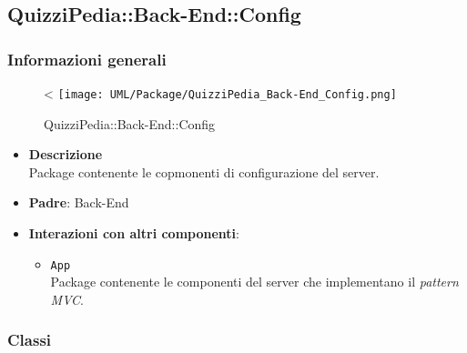 \subsection{QuizziPedia::Back-End::Config}
\subsubsection{Informazioni generali}
\label{QuizziPedia::Back-End::Config}
\begin{figure}
	\centering<
	\texttt{[image: UML/Package/QuizziPedia\_Back-End\_Config.png]}
	\caption{QuizziPedia::Back-End::Config}
\end{figure}
	\begin{itemize}
		\item \textbf{Descrizione} \\
		Package contenente le copmonenti di configurazione del server.
		\item \textbf{Padre}: Back-End
		\item \textbf{Interazioni con altri componenti}:
			\begin{itemize}
				\item \texttt{App} \\
				Package contenente le componenti del server che implementano il \textit{pattern MVC}.
			\end{itemize}
	\end{itemize}
\subsubsection{Classi}
